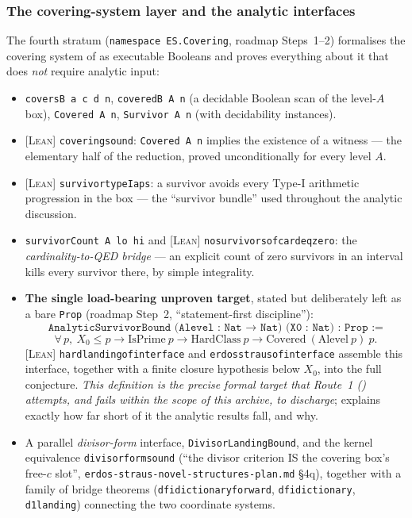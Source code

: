 \documentclass[11pt]{article}
\theoremstyle{plain}
\theoremstyle{definition}
\theoremstyle{remark}
\newcommand{\LEAN}{\textcolor{proved}{\textsc{[Lean]}}}
\newcommand{\lean}[1]{\texttt{#1}}
\renewcommand{\_}{\textunderscore\allowbreak}
\begin{document}
\subsubsection{The covering-system layer and the analytic interfaces}
\label{subsec:coveringlayer}

The fourth stratum (\lean{namespace ES.Covering}, roadmap Steps~1--2) formalises the covering
system of  as executable Booleans and proves everything about it that does
\emph{not} require analytic input:
\begin{itemize}[leftmargin=1.4em]
  \item \lean{coversB a c d n}, \lean{coveredB A n} (a decidable Boolean scan of the level-$A$
        box), \lean{Covered A n}, \lean{Survivor A n} (with decidability instances).
  \item \LEAN{} \lean{covering\_sound}: \lean{Covered A n} implies the existence of a witness —
        the elementary half of the reduction, proved unconditionally for every level $A$.
  \item \LEAN{} \lean{survivor\_typeI\_aps}: a survivor avoids every Type-I arithmetic
        progression in the box — the ``survivor bundle'' used throughout the analytic
        discussion.
  \item \lean{survivorCount A lo hi} and \LEAN{} \lean{no\_survivors\_of\_card\_eq\_zero}: the
        \emph{cardinality-to-QED bridge} — an explicit count of zero survivors in an interval
        kills every survivor there, by simple integrality.
  \item \textbf{The single load-bearing unproven target}, stated but deliberately left as a
        bare \lean{Prop} (roadmap Step~2, ``statement-first discipline''):
        \[
        \texttt{AnalyticSurvivorBound (Alevel : Nat → Nat) (X0 : Nat) : Prop :=}
        \]
        \[
        \forall\, p,\ X_0\le p \to \mathrm{IsPrime}\ p \to \mathrm{HardClass}\ p \to
        \mathrm{Covered}\ (\mathrm{Alevel}\ p)\ p.
        \]
        \LEAN{} \lean{hard\_landing\_of\_interface} and \lean{erdos\_straus\_of\_interface}
        assemble this interface, together with a finite closure hypothesis below $X_0$, into
        the full conjecture. \emph{This definition is the precise formal target that
        Route~1 () attempts, and fails within the scope of this archive, to
        discharge};  explains exactly how far short of it the analytic
        results fall, and why.
  \item A parallel \emph{divisor-form} interface, \lean{DivisorLandingBound}, and the kernel
        equivalence \lean{divisor\_form\_sound} (``the divisor criterion IS the covering box's
        free-$c$ slot'', \texttt{erdos-\allowbreak straus-\allowbreak novel-\allowbreak structures-\allowbreak plan.md} \S4q), together with a
        family of bridge theorems (\lean{dfi\_dictionary\_forward}, \lean{dfi\_dictionary},
        \lean{d1\_landing}) connecting the two coordinate systems.
\end{itemize}
\end{document}
